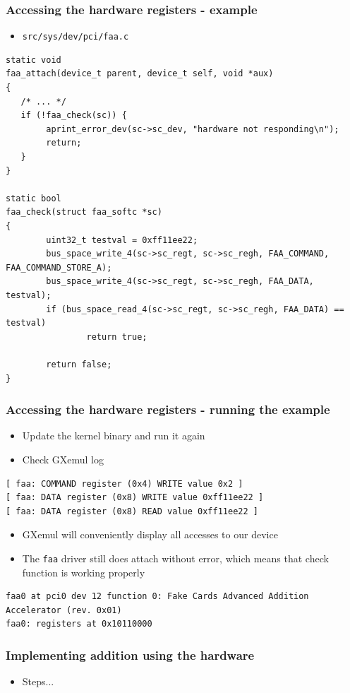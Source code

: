\documentclass[dvipsnames,table]{beamer}
\begin{document}
\begin{frame}[fragile]
\frametitle{Accessing the hardware registers - example}
\begin{itemize}
	\item {\tt src/sys/dev/pci/faa.c}
\end{itemize}
\begin{lstlisting}
static void
faa_attach(device_t parent, device_t self, void *aux)
{
   /* ... */
   if (!faa_check(sc)) {
   		aprint_error_dev(sc->sc_dev, "hardware not responding\n");
        return;
   }
}

static bool
faa_check(struct faa_softc *sc)
{
        uint32_t testval = 0xff11ee22; 
        bus_space_write_4(sc->sc_regt, sc->sc_regh, FAA_COMMAND, FAA_COMMAND_STORE_A);
        bus_space_write_4(sc->sc_regt, sc->sc_regh, FAA_DATA, testval);
        if (bus_space_read_4(sc->sc_regt, sc->sc_regh, FAA_DATA) == testval)
                return true;

        return false;
}
\end{lstlisting}
\end{frame}

\begin{frame}[fragile]
\frametitle{Accessing the hardware registers - running the example}
\begin{itemize}
	\item Update the kernel binary and run it again
	\item Check GXemul log
\end{itemize}
\begin{verbatim}
[ faa: COMMAND register (0x4) WRITE value 0x2 ]
[ faa: DATA register (0x8) WRITE value 0xff11ee22 ]
[ faa: DATA register (0x8) READ value 0xff11ee22 ]
\end{verbatim}
\begin{itemize}
	\item GXemul will conveniently display all accesses to our device
	\item The {\tt faa} driver still does attach without error, which means that check function is working properly
\end{itemize}
\tiny
\begin{verbatim}
faa0 at pci0 dev 12 function 0: Fake Cards Advanced Addition Accelerator (rev. 0x01)
faa0: registers at 0x10110000
\end{verbatim}
\end{frame}

\begin{frame}
\frametitle{Implementing addition using the hardware}
\begin{itemize}
	\item Steps...
\end{itemize}
\end{frame}
\end{document}
